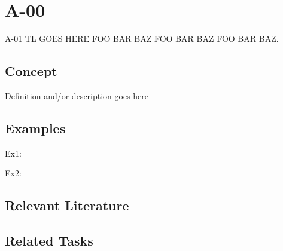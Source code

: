 

\chapter{A-00}
\uppercase{A-01 tl goes here foo bar baz foo bar baz foo bar baz.}
\section{Concept}
Definition and/or description goes here

\section{Examples}
Ex1:

\noindent Ex2:

\section{Relevant Literature}

%
\nocite{test}
\printbibliography
\section{Related Tasks}


